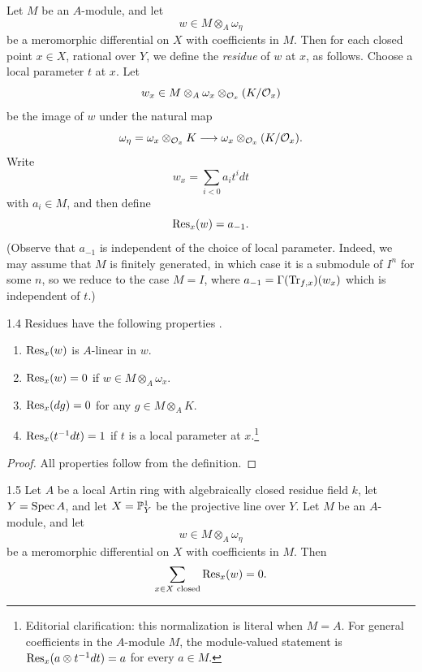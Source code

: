 \begin{definition*}\label{def:7.1.residue}
Let $M$ be an $A$-module, and let
\[
w \in M \otimes_{A} \omega_{\eta}
\]
be a meromorphic differential on $X$ with coefficients in $M$. Then for each closed point $x \in X$, rational over $Y$, we define the \emph{residue} of $w$ at $x$, as follows. Choose a local parameter $t$ at $x$. Let
\[
w_{x} \in M \otimes_{A} \omega_{x} \otimes_{\mathcal{O}_x} (K/\mathcal{O}_{x})
\]
be the image of $w$ under the natural map
\[
\omega_{\eta} = \omega_{x} \otimes_{\mathcal{O}_x} K \longrightarrow \omega_{x} \otimes_{\mathcal{O}_x} (K/\mathcal{O}_{x}).
\]
Write
\[
w_{x} = \sum_{i < 0} a_{i} t^{i} dt
\]
with $a_{i} \in M$, and then define
\[
\operatorname{Res}_{x}(w) = a_{-1}.
\]
(Observe that $a_{-1}$ is independent of the choice of local parameter. Indeed, we may assume that $M$ is finitely generated, in which case it is a submodule of $I^{n}$ for some $n$, so we reduce to the case $M = I$, where $a_{-1} = \Gamma(\operatorname{Tr}_{f,x})(w_{x})$ which is independent of $t$.)
\end{definition*}

\begin{booklemma}{1.4}\label{lem:7.1.4}
Residues have the following properties \cite[\nopp Ch.~II,~\S7]{16}.
\begin{enumerate}
\item[(i)] $\operatorname{Res}_{x}(w)$ is $A$-linear in $w$.
\item[(ii)] $\operatorname{Res}_{x}(w) = 0$ if $w \in M \otimes_A \omega_{x}$.
\item[(iii)] $\operatorname{Res}_{x}(dg) = 0$ for any $g \in M \otimes_{A} K$.
\item[(iv)] $\operatorname{Res}_x(t^{-1}dt)=1$ if $t$ is a local parameter at $x$.\footnote{Editorial clarification: this normalization is literal when $M=A$. For general coefficients in the $A$-module $M$, the module-valued statement is $\operatorname{Res}_x(a\otimes t^{-1}dt)=a$ for every $a\in M$.}
\end{enumerate}
\end{booklemma}

\begin{proof}
All properties follow from the definition.
\end{proof}

\begin{booktheorem}{1.5}\label{thm:7.1.5} Let $A$ be a local Artin ring with algebraically closed residue field $k$, let $Y = \operatorname{Spec} A$, and let $X = \mathbb{P}^{1}_{Y}$ be the projective line over $Y$. Let $M$ be an $A$-module, and let
\[
w \in M \otimes_{A} \omega_{\eta}
\]
be a meromorphic differential on $X$ with coefficients in $M$. Then
\[
\sum_{x \in X \text{ closed}} \operatorname{Res}_{x}(w) = 0.
\]
\end{booktheorem}

